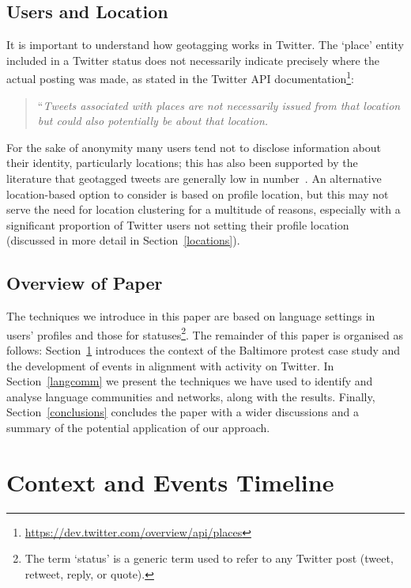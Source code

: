 \documentclass[conference]{IEEEtran}
\begin{document}
\subsection{Users and Location}

It is important to understand how geotagging works in Twitter. The
`place' entity included in a Twitter status does not necessarily
indicate precisely where the actual posting was made, as stated in the
Twitter API
documentation\footnote{\url{https://dev.twitter.com/overview/api/places}}:

\begin{quotation} ``{\emph{Tweets associated with places are not
necessarily issued from that location but could also potentially be
about that location.}}
\end{quotation}

For the sake of anonymity many users tend not to disclose information
about their identity, particularly locations; this has also been
supported by the literature that geotagged tweets are generally low in
number~\cite{kang-et-al:2013}. An alternative location-based option to
consider is based on profile location, but this may not serve the need
for location clustering for a multitude of reasons, especially with a
significant proportion of Twitter users not setting their profile
location~\cite{graham-et-al:2014} (discussed in more detail in
Section~\ref{locations}).

\subsection{Overview of Paper}

The techniques we introduce in this paper are based on language settings
in users' profiles and those for statuses\footnote{The term `status'
is a generic term used to refer to any Twitter post (tweet, retweet,
reply, or quote).}. The remainder of this paper is organised as
follows: Section~\ref{context} introduces the context of the Baltimore
protest case study and the development of events in alignment with
activity on Twitter. In Section~\ref{langcomm} we present the
techniques we have used to identify and analyse language communities
and networks, along with the results. Finally,
Section~\ref{conclusions} concludes the paper with a wider discussions
and a summary of the potential application of our approach.


\section{Context and Events Timeline}\label{context}
\end{document}
